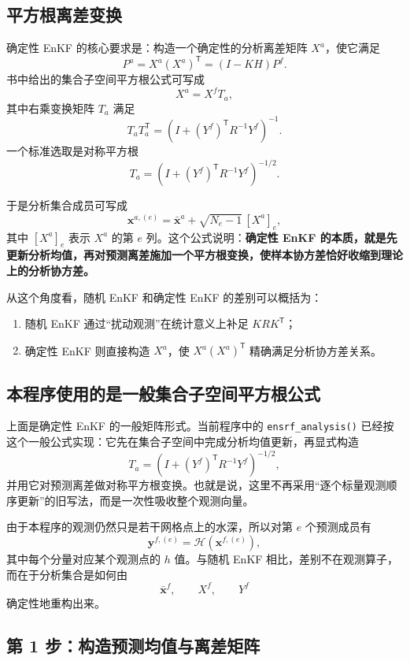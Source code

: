 \documentclass[12pt,a4paper]{article}
\begin{document}
\subsection{平方根离差变换}

确定性 EnKF 的核心要求是：构造一个确定性的分析离差矩阵 $X^a$，使它满足
\[
P^a = X^a (X^a)^{\mathsf T}
= (I-KH)P^f.
\]
书中给出的集合子空间平方根公式可写成
\[
X^a = X^f T_a,
\]
其中右乘变换矩阵 $T_a$ 满足
\[
T_a T_a^{\mathsf T}
= \left(I + (Y^f)^{\mathsf T} R^{-1} Y^f\right)^{-1}.
\]
一个标准选取是对称平方根
\[
T_a
= \left(I + (Y^f)^{\mathsf T} R^{-1} Y^f\right)^{-1/2}.
\]

于是分析集合成员可写成
\[
\mathbf{x}^{a,(e)}
= \bar{\mathbf{x}}^a + \sqrt{N_e-1}\, [X^a]_e,
\]
其中 $[X^a]_e$ 表示 $X^a$ 的第 $e$ 列。这个公式说明：\textbf{确定性 EnKF 的本质，就是先更新分析均值，再对预测离差施加一个平方根变换，使样本协方差恰好收缩到理论上的分析协方差。}

从这个角度看，随机 EnKF 和确定性 EnKF 的差别可以概括为：
\begin{enumerate}
    \item 随机 EnKF 通过“扰动观测”在统计意义上补足 $K R K^{\mathsf T}$；
    \item 确定性 EnKF 则直接构造 $X^a$，使 $X^a(X^a)^{\mathsf T}$ 精确满足分析协方差关系。
\end{enumerate}

\subsection{本程序使用的是一般集合子空间平方根公式}

上面是确定性 EnKF 的一般矩阵形式。当前程序中的 \texttt{ensrf\_analysis()} 已经按这个一般公式实现：它先在集合子空间中完成分析均值更新，再显式构造
\[
T_a=\left(I + (Y^f)^{\mathsf T} R^{-1} Y^f\right)^{-1/2},
\]
并用它对预测离差做对称平方根变换。也就是说，这里不再采用“逐个标量观测顺序更新”的旧写法，而是一次性吸收整个观测向量。

由于本程序的观测仍然只是若干网格点上的水深，所以对第 $e$ 个预测成员有
\[
\mathbf{y}^{f,(e)} = \mathcal{H}(\mathbf{x}^{f,(e)}),
\]
其中每个分量对应某个观测点的 $h$ 值。与随机 EnKF 相比，差别不在观测算子，而在于分析集合是如何由
\[
\bar{\mathbf{x}}^f,\qquad X^f,\qquad Y^f
\]
确定性地重构出来。

\subsection{第 1 步：构造预测均值与离差矩阵}
\end{document}
